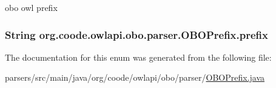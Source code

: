 obo owl prefix \hypertarget{enumorg_1_1coode_1_1owlapi_1_1obo_1_1parser_1_1_o_b_o_prefix_a75d54da35bd40b55bc3028c5bed5190e}{
\subsubsection[{prefix}]{\setlength{\rightskip}{0pt plus 5cm}String org.\-coode.\-owlapi.\-obo.\-parser.\-O\-B\-O\-Prefix.\-prefix\hspace{0.3cm}{\ttfamily [private]}}}\label{enumorg_1_1coode_1_1owlapi_1_1obo_1_1parser_1_1_o_b_o_prefix_a75d54da35bd40b55bc3028c5bed5190e}


The documentation for this enum was generated from the following file\-:\begin{DoxyCompactItemize}
\item 
parsers/src/main/java/org/coode/owlapi/obo/parser/\hyperlink{_o_b_o_prefix_8java}{O\-B\-O\-Prefix.\-java}\end{DoxyCompactItemize}
